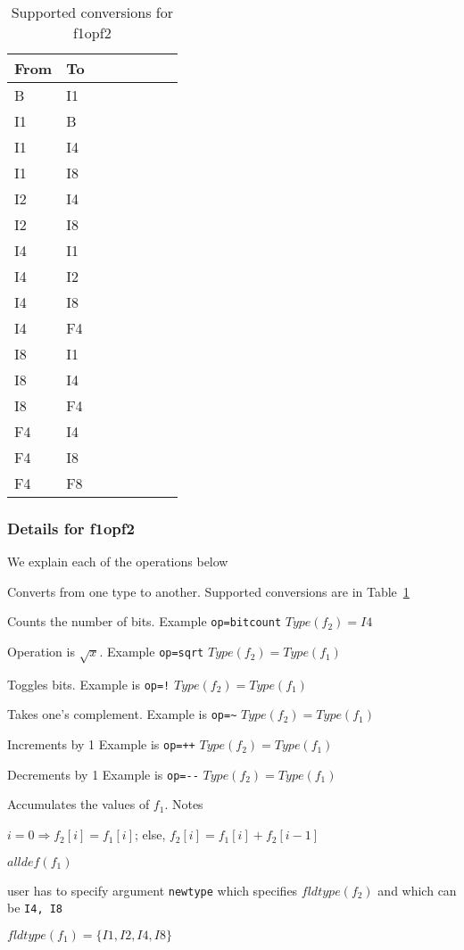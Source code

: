 \begin{table}[hb]
\centering
\begin{tabular}{|l||l|l|l|l|l|l|l|}  \hline \hline
{\bf From} & {\bf To} \\ \hline \hline
B  & I1 \\ \hline 
\hline
I1 & B \\ \hline 
I1 & I4 \\ \hline 
I1 & I8 \\ \hline 
\hline
I2 & I4 \\ \hline 
I2 & I8 \\ \hline 
%
\hline
I4 & I1 \\ \hline 
I4 & I2 \\ \hline 
I4 & I8 \\ \hline 
I4 & F4 \\ \hline 
%
\hline
I8 & I1 \\ \hline 
I8 & I4 \\ \hline 
I8 & F4 \\ \hline 
%
\hline
F4 & I4 \\ \hline 
F4 & I8 \\ \hline 
F4 & F8 \\ \hline 
\hline
\end{tabular}
\caption{Supported conversions for f1opf2}
\label{tbl_conversions}
\end{table}


\subsubsection{Details for f1opf2}
\label{details_f1opf2}
We explain each of the operations below
\bd
\item [CONV] Converts from one type to another. Supported conversions
are in Table~\ref{tbl_conversions}
\item [BITCOUNT] 
Counts the number of bits.
Example \verb+op=bitcount+
\(Type(f_2) = I4\)
\item [SQRT] 
Operation is \(\sqrt{x}\). 
Example \verb+op=sqrt+
\(Type(f_2) = Type(f_1)\)
\item [NEGATION] Toggles bits. 
Example is \verb+op=!+
\(Type(f_2) = Type(f_1)\)
\item [ONE's COMPLEMENT] 
Takes one's complement. 
Example is \verb+op=~+
\(Type(f_2) = Type(f_1)\)
\item [INCREMENT]
Increments by 1
Example is \verb~op=++~
\(Type(f_2) = Type(f_1)\)
\item [DECREMENT]
Decrements by 1
Example is \verb~op=--~
\(Type(f_2) = Type(f_1)\)
\item [CUM] 
Accumulates the values of \(f_1\).  Notes
\be
\item 
\(i = 0 \Rightarrow f_2[i] = f_1[i]\); else, \(f_2[i] = f_1[i] + f_2[i-1]\)
\item \(alldef(f_1)\)
\item user has to specify argument {\tt newtype} which specifies
\(fldtype(f_2)\) and which can be {\tt I4, I8}
\item \(fldtype(f_1) = \{I1, I2, I4, I8\}\)
\ee

